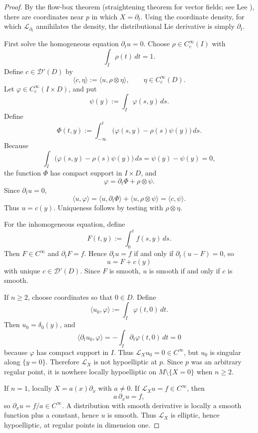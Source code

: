 \documentclass[12pt]{article}
\theoremstyle{definition}
\newcommand{\D}{\mathcal{D}}
\begin{document}
\begin{proof}
By the flow-box theorem (straightening theorem for vector fields; see Lee \cite[Chapter 9]{Lee}), there are coordinates near \(p\) in which \(X=\partial_t\).  Using the coordinate density, for which \(\mathcal L_{\partial_t}\) annihilates the density, the distributional Lie derivative is simply \(\partial_t\).

First solve the homogeneous equation \(\partial_t u=0\).  Choose \(\rho\in C_c^\infty(I)\) with
\[
\int_I \rho(t)\,dt=1.
\]
Define \(c\in \D'(D)\) by
\[
\langle c,\eta\rangle:=\langle u,\rho\otimes\eta\rangle,
\qquad \eta\in C_c^\infty(D).
\]
Let \(\varphi\in C_c^\infty(I\times D)\), and put
\[
\psi(y):=\int_I \varphi(s,y)\,ds.
\]
Define
\[
\Phi(t,y):=\int_{-\infty}^t\bigl(\varphi(s,y)-\rho(s)\psi(y)\bigr)\,ds.
\]
Because
\[
\int_I\bigl(\varphi(s,y)-\rho(s)\psi(y)\bigr)\,ds
=
\psi(y)-\psi(y)=0,
\]
the function \(\Phi\) has compact support in \(I\times D\), and
\[
\varphi=\partial_t\Phi+\rho\otimes\psi.
\]
Since \(\partial_t u=0\),
\[
\langle u,\varphi\rangle
=
\langle u,\partial_t\Phi\rangle+\langle u,\rho\otimes\psi\rangle
=
\langle c,\psi\rangle.
\]
Thus \(u=c(y)\).  Uniqueness follows by testing with \(\rho\otimes\eta\).

For the inhomogeneous equation, define
\[
F(t,y):=\int_0^t f(s,y)\,ds.
\]
Then \(F\in C^\infty\) and \(\partial_t F=f\).  Hence \(\partial_t u=f\) if and only if \(\partial_t(u-F)=0\), so
\[
u=F+c(y)
\]
with unique \(c\in \D'(D)\).  Since \(F\) is smooth, \(u\) is smooth if and only if \(c\) is smooth.

If \(n\ge 2\), choose coordinates so that \(0\in D\).  Define
\[
\langle u_0,\varphi\rangle:=\int_I \varphi(t,0)\,dt.
\]
Then \(u_0=\delta_0(y)\), and
\[
\langle \partial_t u_0,\varphi\rangle
=
-\int_I \partial_t\varphi(t,0)\,dt=0
\]
because \(\varphi\) has compact support in \(I\).  Thus \(\mathcal L_X u_0=0\in C^\infty\), but \(u_0\) is singular along \(\{y=0\}\).  Therefore \(\mathcal L_X\) is not hypoelliptic at \(p\).  Since \(p\) was an arbitrary regular point, it is nowhere locally hypoelliptic on \(M\setminus\{X=0\}\) when \(n\ge 2\).

If \(n=1\), locally \(X=a(x)\partial_x\) with \(a\neq 0\).  If \(\mathcal L_X u=f\in C^\infty\), then
\[
a\,\partial_x u=f,
\]
so \(\partial_x u=f/a\in C^\infty\).  A distribution with smooth derivative is locally a smooth function plus a constant, hence \(u\) is smooth.  Thus \(\mathcal L_X\) is elliptic, hence hypoelliptic, at regular points in dimension one.
\end{proof}
\end{document}
